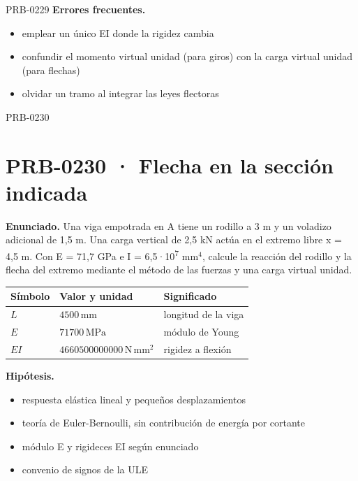 \begin{studiumworked}{PRB-0229}
\textbf{Errores frecuentes.}\begin{itemize}\item emplear un único EI donde la rigidez cambia
\item confundir el momento virtual unidad (para giros) con la carga virtual unidad (para flechas)
\item olvidar un tramo al integrar las leyes flectoras\end{itemize}

\end{studiumworked}

\Needspace{.3\textheight}

\begin{studiumworked}{PRB-0230}

\section{PRB-0230 · Flecha en la sección indicada}

\textbf{Enunciado.} Una viga empotrada en A tiene un rodillo a 3 m y un voladizo adicional de 1,5 m. Una carga vertical de 2,5 kN actúa en el extremo libre x = 4,5 m. Con E = 71,7 GPa e I = 6,5·10\textsuperscript{7} mm$^4$, calcule la reacción del rodillo y la flecha del extremo mediante el método de las fuerzas y una carga virtual unidad.

\par\medskip\noindent\begin{tabular}{@{}p{.18\linewidth}p{.26\linewidth}p{.48\linewidth}@{}}
\toprule Símbolo & Valor y unidad & Significado\\\midrule
$L$ & $4500\,\mathrm{mm}$ & longitud de la viga\\
$E$ & $71700\,\mathrm{MPa}$ & módulo de Young\\
$EI$ & $4660500000000\,\mathrm{N\,mm^2}$ & rigidez a flexión\\
\bottomrule\end{tabular}\par\medskip

\textbf{Hipótesis.}\begin{itemize}\item respuesta elástica lineal y pequeños desplazamientos
\item teoría de Euler-Bernoulli, sin contribución de energía por cortante
\item módulo E y rigideces EI según enunciado
\item convenio de signos de la ULE\end{itemize}


\end{studiumworked}
